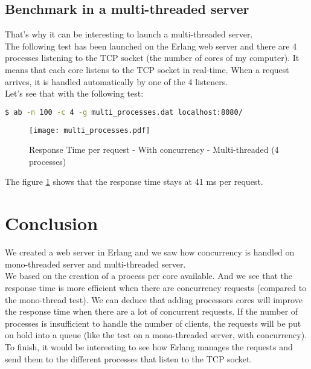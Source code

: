 \documentclass[a4paper, 11pt]{article}
\begin{document}
\subsection{Benchmark in a multi-threaded server}

That's why it can be interesting to launch a multi-threaded server.\\

The following test has been launched on the Erlang web server and there are 4 processes listening to the TCP socket (the number of cores of my computer). It means that each core listens to the TCP socket in real-time. When a request arrives, it is handled automatically by one of the 4 listeners.\\

Let's see that with the following test:
\begin{lstlisting}[language=Bash]
$ ab -n 100 -c 4 -g multi_processes.dat localhost:8080/
\end{lstlisting}

\begin{figure}[H]
\texttt{[image: multi\_processes.pdf]}
\centering
\caption{Response Time per request - With concurrency - Multi-threaded (4 processes)}
\label{multi_threaded}
\end{figure}

The figure \ref{multi_threaded} shows that the response time stays at 41 ms per request.


\section{Conclusion}
We created a web server in Erlang and we saw how concurrency is handled on mono-threaded server and multi-threaded server.\\

We based on the creation of a process per core available. And we see that the response time is more efficient when there are concurrency requests (compared to the mono-thread test). We can deduce that adding processors cores will improve the response time when there are a lot of concurrent requests. 
If the number of processes is insufficient to handle the number of clients, the requests will be put on hold into a queue (like the test on a mono-threaded server, with concurrency).\\

To finish, it would be interesting to see how Erlang manages the requests and send them to the different processes that listen to the TCP socket.
\end{document}
